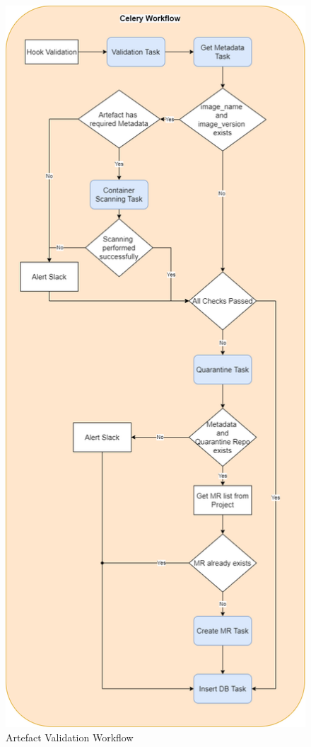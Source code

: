 \documentclass[a4paper,
               keeplastbox,   %
               ]{jacow}
\begin{document}
\begin{figure}[!htb]
    \centering
    \includegraphics*[width=0.8\columnwidth]{Artefact-Validation-Workflow}
    \caption{Artefact Validation Workflow}
    \label{fig:Artefact-Validation-Workflow}
 \end{figure}
\end{document}
